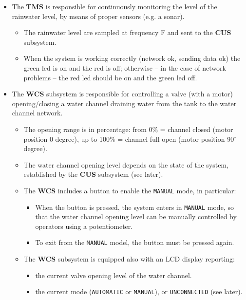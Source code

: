 \documentclass[12pt, letterpaper, twoside]{article}
\begin{document}
\begin{itemize}
    \item The \textbf{TMS} is responsible for continuously monitoring the level of the rainwater level, by means of proper sensors (e.g. a sonar). 
    \begin{itemize}
        \item The rainwater level are sampled at frequency F and sent to the \textbf{CUS} subsystem.
        \item When the system is working correctly (network ok, sending data ok)  the green led is on and the red is off; otherwise -- in the case of network problems -- the red led should be on and the green led off.
    \end{itemize}
    \item The \textbf{WCS} subsystem is responsible for controlling a valve (with a motor) opening/closing a water channel draining water from the tank to the water channel network.
    \begin{itemize}
        \item The opening range is in percentage: from 0\% = channel closed (motor position 0 degree), up to 100\% = channel full open (motor position 90$^\circ$ degree).
        \item The water channel opening level depends on the state of the system, established by the \textbf{CUS} subsystem (see later). 
        \item The \textbf{WCS} includes a button to enable the \texttt{MANUAL} mode, in particular:
        \begin{itemize}
            \item When the button is pressed, the system enters in \texttt{MANUAL} mode, so that the water channel opening level can be manually controlled by operators using a potentiometer. 
            \item To exit from the \texttt{MANUAL} model, the button must be pressed again.  
        \end{itemize}
        \item The \textbf{WCS} subsystem is equipped also with an LCD display reporting: 
        \begin{itemize}
            \item the current valve opening level of the water channel.
            \item the current mode (\texttt{AUTOMATIC} or \texttt{MANUAL}), or \texttt{UNCONNECTED} (see later).
        \end{itemize}
    \end{itemize}

\end{itemize}
\end{document}
